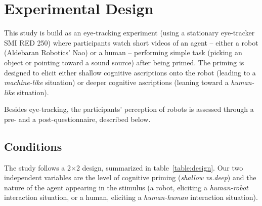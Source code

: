 \documentclass[lettersize, noapacite, twoside, HRI]{apa_HRI}
\newcommand{\vs}{\textit{vs.}\xspace}
\begin{document}
\section{Experimental Design}


This study is build as an eye-tracking experiment (using a stationary
eye-tracker SMI RED 250) where participants watch short videos of an agent --
either a robot (Aldebaran Robotics' Nao) or a human -- performing simple
task (picking an object or pointing toward a sound source) after being primed.
The priming is designed to elicit either shallow cognitive ascriptions onto the
robot (leading to a \emph{machine-like} situation) or deeper cognitive
ascriptions (leaning toward a \emph{human-like} situation).

Besides eye-tracking, the participants' perception of robots is assessed through a
pre- and a post-questionnaire, described below.

\subsection{Conditions}

The study follows a 2$\times$2 design, summarized in table~\ref{table:design}.
Our two independent variables are the level of cognitive priming (\emph{shallow}
\vs \emph{deep}) and the nature of the agent appearing in the stimulus (a robot,
eliciting a \emph{human-robot} interaction situation, or a human, eliciting a
\emph{human-human} interaction situation).
\end{document}
